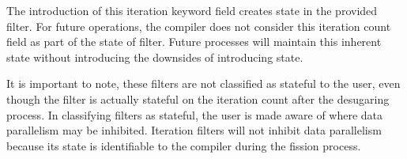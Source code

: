 The introduction of this iteration keyword field creates state in the provided filter.  For future operations, the compiler does not consider this iteration count field as part of the state of filter.  Future processes will maintain this inherent state without introducing the downsides of introducing state.

It is important to note, these filters are not classified as stateful to the user, even though the filter is actually stateful on the iteration count after the desugaring process.  In classifying filters as stateful, the user is made aware of where data parallelism may be inhibited.  Iteration filters will not inhibit data parallelism because its state is identifiable to the compiler during the fission process.   

